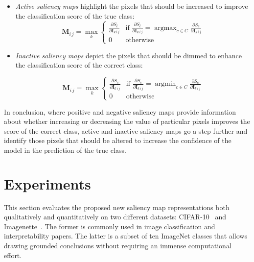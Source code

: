 \documentclass[preprint,12pt]{elsarticle}
\DeclareMathOperator*{\argmax}{argmax}
\DeclareMathOperator*{\argmin}{argmin}
\begin{document}
\begin{itemize}
    \item \emph{Active saliency maps} highlight the pixels that should be increased to improve the classification score of the true class:
    \begin{equation}
      \boldsymbol{M}_{i\, j} = \max_{k}
        \begin{cases}
            \frac{\partial S_{\hat{c}}}{\partial \boldsymbol{I}_{k\, i\, j}} & \text{if } \frac{\partial S_{\hat{c}}}{\partial \boldsymbol{I}_{k\, i\, j}} = \argmax_{c \in C}\frac{\partial S_{c}}{\partial \boldsymbol{I}_{k\, i\, j}} \\
            0 & \text{otherwise}
        \end{cases}
        \label{eq: active saliency map}
    \end{equation}

    \item \emph{Inactive saliency maps} depict the pixels that should be dimmed to enhance the classification score of the correct class:
    
    \begin{equation}
      \boldsymbol{M}_{i\, j} = \max_{k}
        \begin{cases}
            \frac{\partial S_{\hat{c}}}{\partial \boldsymbol{I}_{k\, i\, j}} & \text{if } \frac{\partial S_{\hat{c}}}{\partial \boldsymbol{I}_{k\, i\, j}} = \argmin_{c \in C}\frac{\partial S_{c}}{\partial \boldsymbol{I}_{k\, i\, j}} \\
            0 & \text{otherwise}
        \end{cases}
        \label{eq: inactive saliency map}
    \end{equation}

\end{itemize}

In conclusion, where positive and negative saliency maps provide information about whether increasing or decreasing the value of particular pixels improves the score of the correct class, active and inactive saliency maps go a step further and identify those pixels that should be altered to increase the confidence of the model in the prediction of the true class. 

\section{Experiments}
\label{sec:experiments}
This section evaluates the proposed new saliency map representations both qualitatively and quantitatively on two different datasets: {CIFAR-10}~\cite{CIFAR10CIFAR100Datasets} and Imagenette~\cite{Imagenette2022}. The former is commonly used in image classification and interpretability papers. The latter is a subset of ten ImageNet classes that allows drawing grounded conclusions without requiring an immense computational effort. 
\end{document}
